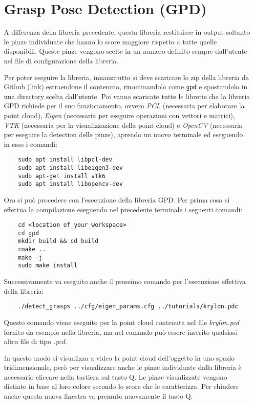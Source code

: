 \documentclass{report}
\begin{document}
\section{Grasp Pose Detection (GPD)}\label{GPD}
A differenza della libreria precedente, questa libreria restituisce in output soltanto le pinze individuate che hanno lo score maggiore rispetto a tutte quelle disponibili. Queste pinze vengono scelte in un numero definito sempre dall'utente nel file di configurazione della libreria. \par
Per poter eseguire la libreria, innanzitutto si deve scaricare lo zip della libreria da Github (\textcolor{blue}{\underline{\href{https://github.com/atenpas/gpd}{link}}}) estraendone il contenuto, rinominandolo come \texttt{gpd} e spostandolo in una directory scelta dall'utente. Poi vanno scaricate tutte le librerie che la libreria GPD richiede per il suo funzionamento, ovvero \textit{PCL} (necessaria per elaborare la point cloud), \textit{Eigen} (necessaria per eseguire operazioni con vettori e matrici), \textit{VTK} (necessaria per la visualizzazione della point cloud) e \textit{OpenCV} (necessaria per eseguire la detection delle pinze), aprendo un nuovo terminale ed eseguendo in esso i comandi:
\begin{verbatim}
	sudo apt install libpcl-dev
	sudo apt install libeigen3-dev
	sudo apt-get install vtk6
	sudo apt install libopencv-dev
\end{verbatim}
Ora si può procedere con l'esecuzione della libreria GPD. Per prima cosa si effettua la compilazione eseguendo nel precedente terminale i seguenti comandi:
\begin{verbatim}
	cd <location_of_your_workspace> 
	cd gpd
	mkdir build && cd build
	cmake ..
	make -j
	sudo make install
\end{verbatim}
Successivamente va eseguito anche il prossimo comando per l'esecuzione effettiva della libreria:
\begin{verbatim}
	./detect_grasps ../cfg/eigen_params.cfg ../tutorials/krylon.pdc
\end{verbatim}
Questo comando viene eseguito per la point cloud contenuta nel file \textit{krylon.pcd} fornito da esempio nella libreria, ma nel comando può essere inserito qualsiasi altro file di tipo \textit{.pcd}. \par
In questo modo si visualizza a video la point cloud dell'oggetto in uno spazio tridimensionale, però per visualizzare anche le pinze individuate dalla libreria è necessario cliccare nella tastiera sul tasto Q. Le pinze visualizzate vengono distinte in base al loro colore secondo lo score che le caratterizza. Per chiudere anche questa nuova finestra va premuto nuovamente il tasto Q.
\end{document}
